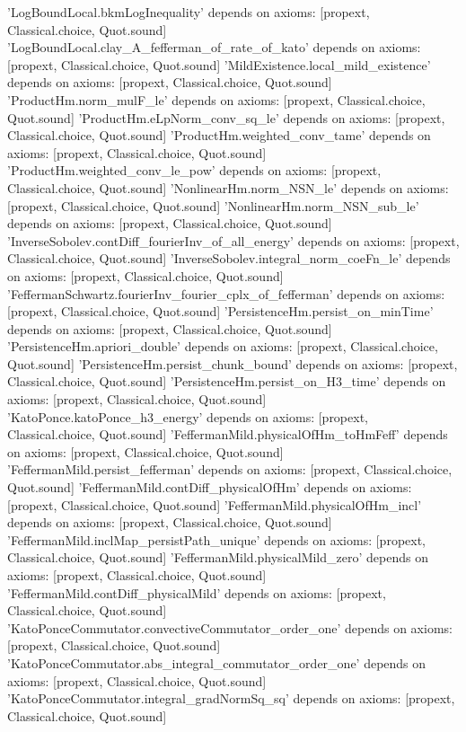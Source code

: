 \documentclass[11pt,a4paper]{article}
\theoremstyle{definition}
\theoremstyle{remark}
\begin{document}
\begin{leancode}
'LogBoundLocal.bkmLogInequality' depends on axioms: [propext, Classical.choice, Quot.sound]
'LogBoundLocal.clay_A_fefferman_of_rate_of_kato' depends on axioms: [propext, Classical.choice, Quot.sound]
'MildExistence.local_mild_existence' depends on axioms: [propext, Classical.choice, Quot.sound]
'ProductHm.norm_mulF_le' depends on axioms: [propext, Classical.choice, Quot.sound]
'ProductHm.eLpNorm_conv_sq_le' depends on axioms: [propext, Classical.choice, Quot.sound]
'ProductHm.weighted_conv_tame' depends on axioms: [propext, Classical.choice, Quot.sound]
'ProductHm.weighted_conv_le_pow' depends on axioms: [propext, Classical.choice, Quot.sound]
'NonlinearHm.norm_NSN_le' depends on axioms: [propext, Classical.choice, Quot.sound]
'NonlinearHm.norm_NSN_sub_le' depends on axioms: [propext, Classical.choice, Quot.sound]
'InverseSobolev.contDiff_fourierInv_of_all_energy' depends on axioms: [propext, Classical.choice, Quot.sound]
'InverseSobolev.integral_norm_coeFn_le' depends on axioms: [propext, Classical.choice, Quot.sound]
'FeffermanSchwartz.fourierInv_fourier_cplx_of_fefferman' depends on axioms: [propext, Classical.choice, Quot.sound]
'PersistenceHm.persist_on_minTime' depends on axioms: [propext, Classical.choice, Quot.sound]
'PersistenceHm.apriori_double' depends on axioms: [propext, Classical.choice, Quot.sound]
'PersistenceHm.persist_chunk_bound' depends on axioms: [propext, Classical.choice, Quot.sound]
'PersistenceHm.persist_on_H3_time' depends on axioms: [propext, Classical.choice, Quot.sound]
'KatoPonce.katoPonce_h3_energy' depends on axioms: [propext, Classical.choice, Quot.sound]
'FeffermanMild.physicalOfHm_toHmFeff' depends on axioms: [propext, Classical.choice, Quot.sound]
'FeffermanMild.persist_fefferman' depends on axioms: [propext, Classical.choice, Quot.sound]
'FeffermanMild.contDiff_physicalOfHm' depends on axioms: [propext, Classical.choice, Quot.sound]
'FeffermanMild.physicalOfHm_incl' depends on axioms: [propext, Classical.choice, Quot.sound]
'FeffermanMild.inclMap_persistPath_unique' depends on axioms: [propext, Classical.choice, Quot.sound]
'FeffermanMild.physicalMild_zero' depends on axioms: [propext, Classical.choice, Quot.sound]
'FeffermanMild.contDiff_physicalMild' depends on axioms: [propext, Classical.choice, Quot.sound]
'KatoPonceCommutator.convectiveCommutator_order_one' depends on axioms: [propext, Classical.choice, Quot.sound]
'KatoPonceCommutator.abs_integral_commutator_order_one' depends on axioms: [propext, Classical.choice, Quot.sound]
'KatoPonceCommutator.integral_gradNormSq_sq' depends on axioms: [propext, Classical.choice, Quot.sound]

\end{leancode}
\end{document}
